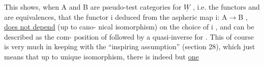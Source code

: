This shows, when A and B are pseudo-test categories for $\underline{W}$ , i.e. the
functors  and  are equivalences, that the functor i\hand{$\overline{\phantom{i}}^{*}$} deduced
from the aspheric  map i: A$\rightarrow$B , \uline{does not depend} (up to cano-%
nical isomorphism) on the choice of i , and can be described as the com-%
position of  followed by a quasi-inverse for  . This of course
is very much in keeping with the ``inspiring assumption'' (section 28),
which just means that up to unique isomorphism, there is indeed but \uline{one}

